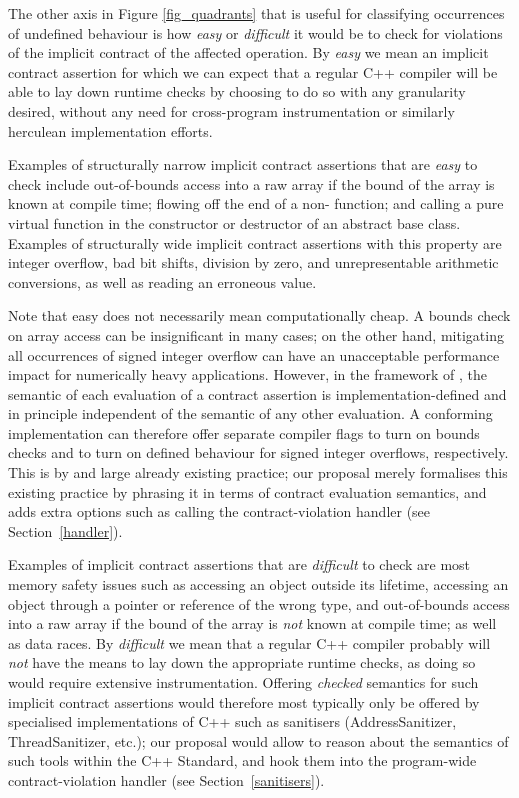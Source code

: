 The other axis in Figure \ref{fig_quadrants} that is useful for classifying occurrences of undefined behaviour is how \emph{easy} or \emph{difficult} it would be to check for violations of the implicit contract of the affected operation. By \emph{easy} we mean an implicit contract assertion for which we can expect that a regular C++ compiler will be able to lay down runtime checks by choosing to do so with any granularity desired, without any need for cross-program instrumentation or similarly herculean implementation efforts.

Examples of structurally narrow implicit contract assertions that are \emph{easy} to check include out-of-bounds access into a raw array if the bound of the array is known at compile time; flowing off the end of a non- function; and calling a pure virtual function in the constructor or destructor of an abstract base class. Examples of structurally wide implicit contract assertions with this property are integer overflow, bad bit shifts, division by zero, and unrepresentable arithmetic conversions, as well as reading an erroneous value.

Note that easy does not necessarily mean computationally cheap. A bounds check on array access can be insignificant in many cases; on the other hand, mitigating all occurrences of signed integer overflow can have an unacceptable performance impact for numerically heavy applications. However, in the framework of \cite{P2900R9}, the semantic of each evaluation of a contract assertion is implementation-defined and in principle independent of the semantic of any other evaluation. A conforming implementation can therefore offer separate compiler flags to turn on bounds checks and to turn on defined behaviour for signed integer overflows, respectively. This is by and large already existing practice; our proposal merely formalises this existing practice by phrasing it in terms of contract evaluation semantics, and adds extra options such as calling the contract-violation handler (see Section~\ref{handler}).

Examples of implicit contract assertions that are \emph{difficult} to check are most memory safety issues such as accessing an object outside its lifetime, accessing an object through a pointer or reference of the wrong type, and out-of-bounds access into a raw array if the bound of the array is \emph{not} known at compile time; as well as data races. By \emph{difficult} we mean that a regular C++ compiler probably will \emph{not} have the means to lay down the appropriate runtime checks, as doing so would require extensive instrumentation. Offering \emph{checked} semantics for such implicit contract assertions would therefore most typically only be offered by specialised implementations of C++ such as sanitisers (AddressSanitizer, ThreadSanitizer, etc.); our proposal would allow to reason about the semantics of such tools within the C++ Standard, and hook them into the program-wide contract-violation handler (see Section~\ref{sanitisers}).


